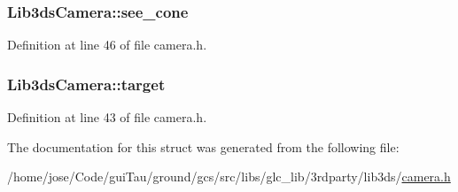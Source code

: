 \hypertarget{struct_lib3ds_camera_a09c05096cbd33f106869ca339e843f22}{
\subsubsection[{see\-\_\-cone}]{ Lib3ds\-Camera\-::see\-\_\-cone}}\label{struct_lib3ds_camera_a09c05096cbd33f106869ca339e843f22}


Definition at line 46 of file camera.\-h.

\hypertarget{struct_lib3ds_camera_ab3d73f084d9cc27a578cc4a232b699d7}{
\subsubsection[{target}]{ Lib3ds\-Camera\-::target}}\label{struct_lib3ds_camera_ab3d73f084d9cc27a578cc4a232b699d7}


Definition at line 43 of file camera.\-h.



The documentation for this struct was generated from the following file\-:\begin{DoxyCompactItemize}
\item 
/home/jose/\-Code/gui\-Tau/ground/gcs/src/libs/glc\-\_\-lib/3rdparty/lib3ds/\hyperlink{camera_8h}{camera.\-h}\end{DoxyCompactItemize}
